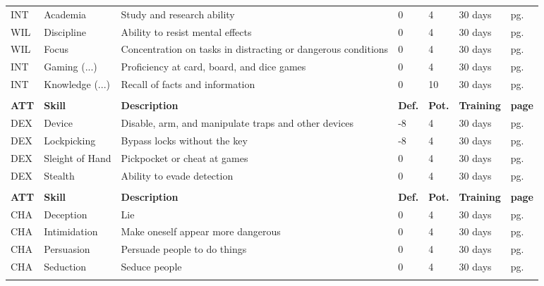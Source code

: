 \begin{center}
\begin{xltabular}{\textwidth}{l l X l l l l}
        INT & Academia & Study and research ability & 0 & 4 & 30 days & pg. \pageref{skill:academia} \\
        WIL & Discipline & Ability to resist mental effects & 0 & 4 & 30 days & pg. \pageref{skill:self-control} \\
        WIL & Focus & Concentration on tasks in distracting or dangerous conditions & 0 & 4 & 30 days & pg. \pageref{skill:concentration} \\
        INT & Gaming (...) & Proficiency at card, board, and dice games & 0 & 4 & 30 days & pg. \pageref{skill:gaming} \\
        INT & Knowledge (...) & Recall of facts and information & 0 & 10 & 30 days & pg. \pageref{skill:knowledge} \\
         \\*
        \textbf{ATT} & \textbf{Skill} & \textbf{Description} & \textbf{Def.} & \textbf{Pot.} & \textbf{Training} & \textbf{page} \\*
        DEX & Device & Disable, arm, and manipulate traps and other devices & -8 & 4 & 30 days & pg. \pageref{skill:device} \\
        DEX & Lockpicking & Bypass locks without the key & -8 & 4 & 30 days & pg. \pageref{skill:lockpicking} \\
        DEX & Sleight of Hand & Pickpocket or cheat at games & 0 & 4 & 30 days & pg. \pageref{skill:sleight-of-hand} \\
        DEX & Stealth & Ability to evade detection & 0 & 4 & 30 days & pg. \pageref{skill:stealth} \\
         \\*
        \textbf{ATT} & \textbf{Skill} & \textbf{Description} & \textbf{Def.} & \textbf{Pot.} & \textbf{Training} & \textbf{page} \\*
        CHA & Deception & Lie & 0 & 4 & 30 days & pg. \pageref{skill:deception} \\
        CHA & Intimidation & Make oneself appear more dangerous & 0 & 4 & 30 days & pg. \pageref{skill:intimidation} \\
        CHA & Persuasion & Persuade people to do things & 0 & 4 & 30 days & pg. \pageref{skill:persuasion} \\
        CHA & Seduction & Seduce people & 0 & 4 & 30 days& pg. \pageref{skill:seduction} \\
         \\*

\end{xltabular}
\end{center}

